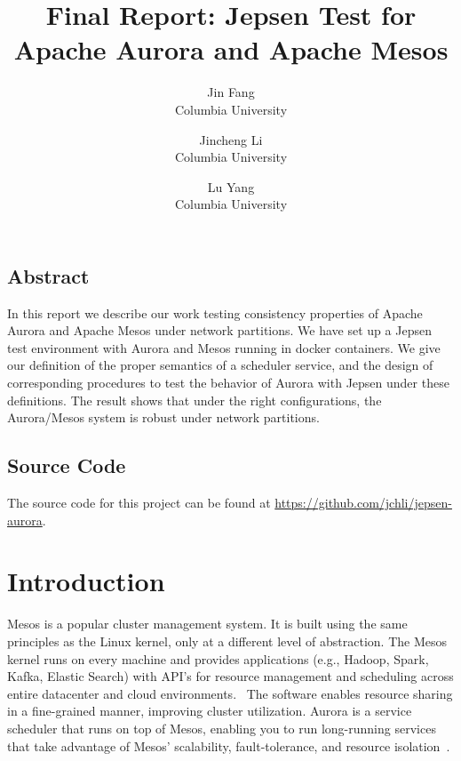 \documentclass[letterpaper,twocolumn,10pt]{article}
\begin{document}
\date{}

\title{\Large \bf Final Report: Jepsen Test for Apache Aurora and Apache Mesos}

\author{
{\rm Jin Fang}\\
Columbia University
\and
{\rm Jincheng Li}\\
Columbia University
\and
{\rm Lu Yang}\\
Columbia University
}
\maketitle

\thispagestyle{empty}


\subsection*{Abstract}
In this report we describe our work testing consistency properties of Apache Aurora and Apache Mesos under network partitions. We have set up a Jepsen test environment with Aurora and Mesos running in docker containers. We give our definition of the proper semantics of a scheduler service, and the design of corresponding procedures to test the behavior of Aurora with Jepsen under these definitions. The result shows that under the right configurations, the Aurora/Mesos system is robust under network partitions. 

\subsection*{Source Code}
The source code for this project can be found at \url{https://github.com/jchli/jepsen-aurora}.

\section{Introduction}
Mesos is a popular cluster management system. It is built using the same principles as the Linux kernel, only at a different level of abstraction. The Mesos kernel runs on every machine and provides applications (e.g., Hadoop, Spark, Kafka, Elastic Search) with API’s for resource management and scheduling across entire datacenter and cloud environments.~\cite{Mesos} The software enables resource sharing in a fine-grained manner, improving cluster utilization. Aurora is a service scheduler that runs on top of Mesos, enabling you to run long-running services that take advantage of Mesos’ scalability, fault-tolerance, and resource isolation~\cite{Aurora}.
\end{document}
